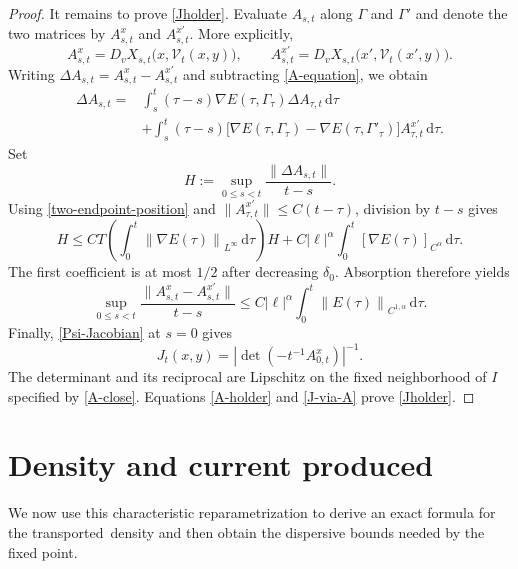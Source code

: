 \documentclass[11pt]{article}
\newcommand{\norm}[1]{\left\lVert #1\right\rVert}
\newcommand{\dd}{\,\mathrm d}
\begin{document}
\begin{proof}
It remains to prove \eqref{Jholder}.  Evaluate $A_{s,t}$ along $\Gamma$ and
$\Gamma'$ and denote the two matrices by $A^x_{s,t}$ and $A^{x'}_{s,t}$.
More explicitly,
\begin{equation*}
 A^x_{s,t}=D_vX_{s,t}\bigl(x,\mathcal V_t(x,y)\bigr),\qquad
 A^{x'}_{s,t}=D_vX_{s,t}\bigl(x',\mathcal V_t(x',y)\bigr).
\end{equation*}
Writing $\Delta A_{s,t}=A^x_{s,t}-A^{x'}_{s,t}$ and subtracting
\eqref{A-equation}, we obtain
\begin{align*}
 \Delta A_{s,t}
 ={}&\int_s^t(\tau-s)\nabla E(\tau,\Gamma_\tau)
                    \Delta A_{\tau,t}\dd\tau\\
 &+\int_s^t(\tau-s)
 \bigl[\nabla E(\tau,\Gamma_\tau)
       -\nabla E(\tau,\Gamma'_\tau)\bigr]
 A^{x'}_{\tau,t}\dd\tau.
\end{align*}
Set
\begin{equation*}
 H:=\sup_{0\leq s<t}\frac{\|\Delta A_{s,t}\|}{t-s}.
\end{equation*}
Using \eqref{two-endpoint-position} and
$\|A^{x'}_{\tau,t}\|\leq C(t-\tau)$, division by $t-s$ gives
 \begin{equation*}
 H\leq CT\!\left(\int_0^t\norm{\nabla E(\tau)}_{L^\infty}\dd\tau\right)H
 +C|\ell|^\alpha\int_0^t
     [\nabla E(\tau)]_{C^\alpha}\dd\tau.
\end{equation*} 
The first coefficient is at most $1/2$ after decreasing $\delta_0$.
Absorption therefore yields
\begin{equation}\label{A-holder}
 \sup_{0\leq s<t}\frac{\|A^x_{s,t}-A^{x'}_{s,t}\|}{t-s}
 \leq C|\ell|^\alpha
       \int_0^t\norm{E(\tau)}_{C^{1,\alpha}}\dd\tau.
\end{equation}
Finally, \eqref{Psi-Jacobian} at $s=0$ gives
\begin{equation}\label{J-via-A}
 J_t(x,y)=
 \left|\det\left(-t^{-1}A^x_{0,t}\right)\right|^{-1}.
\end{equation}
The determinant and its reciprocal are Lipschitz on the fixed neighborhood
of $I$ specified by \eqref{A-close}.  Equations \eqref{A-holder} and
\eqref{J-via-A} prove \eqref{Jholder}.
\end{proof}

\section{Density and current produced}\label{sec:mixing}

We now use this characteristic reparametrization to derive
an exact formula for the transported\ 
density and then obtain the dispersive bounds needed by the fixed point.
\end{document}
